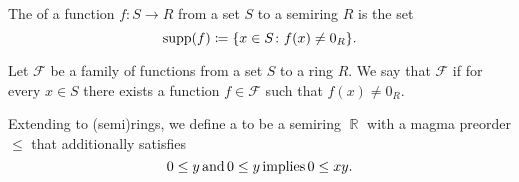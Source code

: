 \begin{definition}\label{def:function_support}
  The  of a function \( f: S \to R \) from a set \( S \) to a semiring \( R \) is the set
  \begin{equation*}
    \operatorname{supp}(f) \coloneqq \{ x \in S \colon f(x) \neq 0_R \}.
  \end{equation*}
\end{definition}

\begin{definition}\label{def:functions_vanish_nowhere}
  Let \( \mathcal{F} \) be a family of functions from a set \( S \) to a ring \( R \). We say that \( \mathcal{F} \)  if for every \( x \in S \) there exists a function \( f \in \mathcal{F} \) such that \( f(x) \neq 0_R \).
\end{definition}

\begin{definition}\label{def:ordered_semiring}
  Extending  to (semi)rings, we define a  to be a semiring \( \BbbR \) with a magma preorder \( \leq \) that additionally satisfies
  \begin{equation}\label{eq:def:ordered_semiring/nonnegativity}
    0 \leq y \mathop{\text{and}} 0 \leq y \mathop{\text{implies}} 0 \leq xy.
  \end{equation}
\end{definition}
